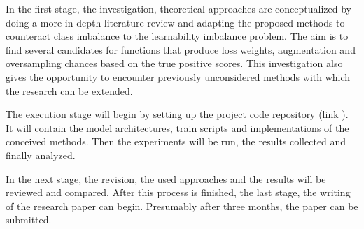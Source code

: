 \documentclass[journal]{IEEEtran}
\begin{document}
In the first stage, the investigation, theoretical approaches are conceptualized by doing a more in depth literature review and adapting the proposed methods to counteract class imbalance to the learnability imbalance problem. 
The aim is to find several candidates for functions that produce loss weights, augmentation and oversampling chances based on the true positive scores.
This investigation also gives the opportunity to encounter previously unconsidered methods with which the research can be extended.

The execution stage will begin by setting up the project code repository (link \cite{githubResearchProposal}). 
It will contain the model architectures, train scripts and implementations of the conceived methods.
Then the experiments will be run, the results collected and finally analyzed. 

In the next stage, the revision, the used approaches and the results will be reviewed and compared. 
After this process is finished, the last stage, the writing of the research paper can begin. 
Presumably after three months, the paper can be submitted.  

\printbibliography
\end{document}
